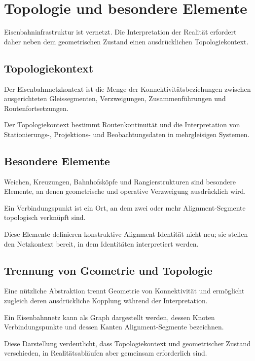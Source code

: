 \chapter{Topologie und besondere Elemente}
\label{chap:topology-and-special-elements}

Eisenbahninfrastruktur ist vernetzt. Die Interpretation der Realität erfordert
daher neben dem geometrischen Zustand einen ausdrücklichen Topologiekontext.

\section{Topologiekontext}
\begin{definition}[Eisenbahnnetzkontext]
Der Eisenbahnnetzkontext ist die Menge der Konnektivitätsbeziehungen zwischen
ausgerichteten Gleissegmenten, Verzweigungen, Zusammenführungen und
Routenfortsetzungen.
\end{definition}
Der Topologiekontext bestimmt Routenkontinuität und die Interpretation von
Stationierungs-, Projektions- und Beobachtungsdaten in mehrgleisigen Systemen.

\section{Besondere Elemente}
Weichen, Kreuzungen, Bahnhofsköpfe und Rangierstrukturen sind besondere
Elemente, an denen geometrische und operative Verzweigung ausdrücklich wird.
\begin{definition}[Verbindungspunkt]
Ein Verbindungspunkt ist ein Ort, an dem zwei oder mehr Alignment-Segmente
topologisch verknüpft sind.
\end{definition}
Diese Elemente definieren konstruktive Alignment-Identität nicht neu; sie
stellen den Netzkontext bereit, in dem Identitäten interpretiert werden.

\section{Trennung von Geometrie und Topologie}
Eine nützliche Abstraktion trennt Geometrie von Konnektivität und ermöglicht
zugleich deren ausdrückliche Kopplung während der Interpretation.
\begin{definition}[Graphdarstellung]
Ein Eisenbahnnetz kann als Graph dargestellt werden, dessen Knoten
Verbindungspunkte und dessen Kanten Alignment-Segmente bezeichnen.
\end{definition}
Diese Darstellung verdeutlicht, dass Topologiekontext und geometrischer
Zustand verschieden, in Realitätsabläufen aber gemeinsam erforderlich sind.


